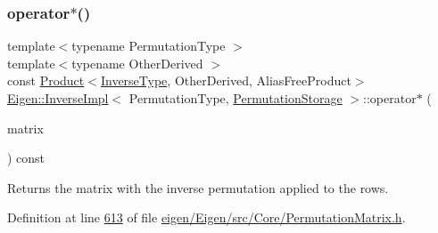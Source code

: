 \subsubsection{\texorpdfstring{operator$\ast$()}{operator*()}\hspace{0.1cm}{\footnotesize\ttfamily [1/2]}}
{\footnotesize\ttfamily template$<$typename Permutation\+Type $>$ \\
template$<$typename Other\+Derived $>$ \\
const \hyperlink{group___core___module_class_eigen_1_1_product}{Product}$<$\hyperlink{class_eigen_1_1_inverse}{Inverse\+Type}, Other\+Derived, Alias\+Free\+Product$>$ \hyperlink{class_eigen_1_1_inverse_impl}{Eigen\+::\+Inverse\+Impl}$<$ Permutation\+Type, \hyperlink{struct_eigen_1_1_permutation_storage}{Permutation\+Storage} $>$\+::operator$\ast$ (\begin{DoxyParamCaption}\item[{const \hyperlink{group___core___module_class_eigen_1_1_matrix_base}{Matrix\+Base}$<$ Other\+Derived $>$ \&}]{matrix }\end{DoxyParamCaption}) const\hspace{0.3cm}{\ttfamily [inline]}}

\begin{DoxyReturn}{Returns}
the matrix with the inverse permutation applied to the rows. 
\end{DoxyReturn}


Definition at line \hyperlink{eigen_2_eigen_2src_2_core_2_permutation_matrix_8h_source_l00613}{613} of file \hyperlink{eigen_2_eigen_2src_2_core_2_permutation_matrix_8h_source}{eigen/\+Eigen/src/\+Core/\+Permutation\+Matrix.\+h}.

\mbox{\label{class_eigen_1_1_inverse_impl_3_01_permutation_type_00_01_permutation_storage_01_4_abf863c3bf5bde58cead077f335bfff3a}} 
